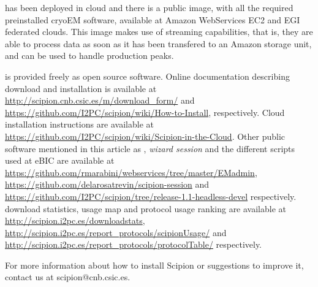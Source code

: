  \scipion has been deployed in cloud and there is a public image, with all the required preinstalled cryoEM software,  available at Amazon WebServices EC2 and EGI federated clouds. This image makes use of \scipion streaming capabilities, that is, they are able to process data as soon as it has been transfered to an Amazon storage unit, and can be used to handle  production peaks.
 
 
\scipion is provided 
freely as open source software. Online documentation
describing \scipion download and installation is available
at \url{http://scipion.cnb.csic.es/m/download_form/} and \url{https://github.com/I2PC/scipion/wiki/How-to-Install}, respectively. Cloud installation instructions are available at \url{https://github.com/I2PC/scipion/wiki/Scipion-in-the-Cloud}. Other public software mentioned in this article as \emadmin, \emph{wizard session} and the different scripts used at eBIC are available at \url{https://github.com/rmarabini/webservices/tree/master/EMadmin}, \url{https://github.com/delarosatrevin/scipion-session} and \url{https://github.com/I2PC/scipion/tree/release-1.1-headless-devel} respectively.
\scipion download statistics, usage map and protocol usage ranking are available at \url{http://scipion.i2pc.es/downloadstats}, \url{http://scipion.i2pc.es/report_protocols/scipionUsage/} and \url{http://scipion.i2pc.es/report_protocols/protocolTable/} respectively.

 For more information about how to install Scipion or
suggestions to improve it, contact us at scipion@cnb.csic.es.






